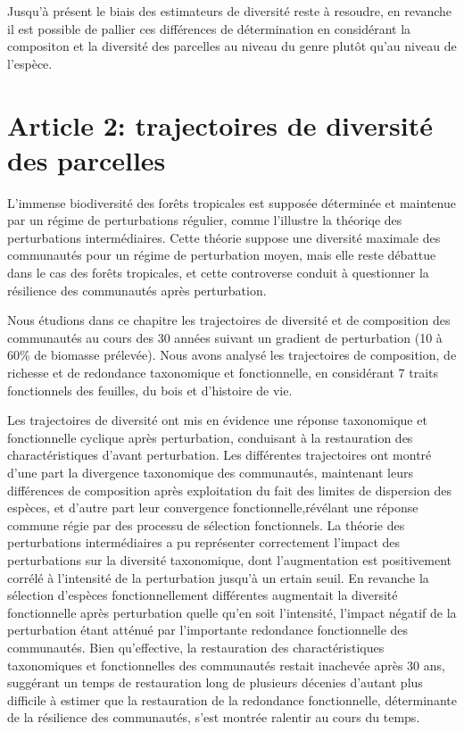 \documentclass[
  11pt,
  french,
  A4paper,
  extrafontsizes,onecolumn,openright
  ]{memoir}
\begin{document}
Jusqu'à présent le biais des estimateurs de diversité reste à resoudre,
en revanche il est possible de pallier ces différences de détermination
en considérant la compositon et la diversité des parcelles au niveau du
genre plutôt qu'au niveau de l'espèce.

\chapter{Article 2: trajectoires de diversité des
parcelles}\label{article-2-trajectoires-de-diversite-des-parcelles}

L'immense biodiversité des forêts tropicales est supposée déterminée et
maintenue par un régime de perturbations régulier, comme l'illustre la
théoriqe des perturbations intermédiaires. Cette théorie suppose une
diversité maximale des communautés pour un régime de perturbation moyen,
mais elle reste débattue dans le cas des forêts tropicales, et cette
controverse conduit à questionner la résilience des communautés après
perturbation.

Nous étudions dans ce chapitre les trajectoires de diversité et de
composition des communautés au cours des 30 années suivant un gradient
de perturbation (10 à 60\% de biomasse prélevée). Nous avons analysé les
trajectoires de composition, de richesse et de redondance taxonomique et
fonctionnelle, en considérant 7 traits fonctionnels des feuilles, du
bois et d'histoire de vie.

Les trajectoires de diversité ont mis en évidence une réponse
taxonomique et fonctionnelle cyclique après perturbation, conduisant à
la restauration des charactéristiques d'avant perturbation. Les
différentes trajectoires ont montré d'une part la divergence taxonomique
des communautés, maintenant leurs différences de composition après
exploitation du fait des limites de dispersion des espèces, et d'autre
part leur convergence fonctionnelle,révélant une réponse commune régie
par des processu de sélection fonctionnels. La théorie des perturbations
intermédiaires a pu représenter correctement l'impact des perturbations
sur la diversité taxonomique, dont l'augmentation est positivement
corrélé à l'intensité de la perturbation jusqu'à un ertain seuil. En
revanche la sélection d'espèces fonctionnellement différentes augmentait
la diversité fonctionnelle après perturbation quelle qu'en soit
l'intensité, l'impact négatif de la perturbation étant atténué par
l'importante redondance fonctionnelle des communautés. Bien
qu'effective, la restauration des charactéristiques taxonomiques et
fonctionnelles des communautés restait inachevée après 30 ans, suggérant
un temps de restauration long de plusieurs décenies d'autant plus
difficile à estimer que la restauration de la redondance fonctionnelle,
déterminante de la résilience des communautés, s'est montrée ralentir au
cours du temps.
\end{document}
